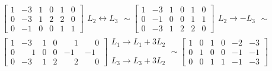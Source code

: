 \begin{exemplo}
\begin{solucao}
\begin{align*}
            &\left[
                \begin{array}{ccc|ccc}
                    1 & -3 & 1 & 0 & 1 & 0\\
                    0 & -3 & 1 & 2 & 2 & 0\\
                    0 & -1 & 0 & 0 & 1 & 1
                \end{array}
            \right]
            \begin{array}{l}
                \phantom{x}\\L_2 \leftrightarrow L_3\\\phantom{x}
            \end{array}\sim
            \left[
                \begin{array}{ccc|ccc}
                    1 & -3 & 1 & 0 & 1 & 0\\
                    0 & -1 & 0 & 0 & 1 & 1\\
                    0 & -3 & 1 & 2 & 2 & 0
                \end{array}
            \right]
            \begin{array}{l}
                \phantom{x}\\L_2 \to -L_3\\\phantom{x}
            \end{array}\sim\\
            &\left[
                \begin{array}{ccc|ccc}
                    1 & -3 & 1 & 0 & \phantom{-}1 & \phantom{-}0\\
                    0 & \phantom{-}1 & 0 & 0 & -1 & -1\\
                    0 & -3 & 1 & 2 & \phantom{-}2 & \phantom{-}0
                \end{array}
            \right]
            \begin{array}{l}
                L_1 \to L_1 + 3L_2\\\phantom{x}\\L_3 \to L_3 + 3L_2
            \end{array}\sim
            \left[
                \begin{array}{ccc|ccc}
                    1 & 0 & 1 & 0 & -2 & -3\\
                    0 & 1 & 0 & 0 & -1 & -1\\
                    0 & 0 & 1 & 1 & -1 & -3
                \end{array}
            \right]
            \begin{array}{l}

\end{array}
\end{align*}
\end{solucao}
\end{exemplo}
